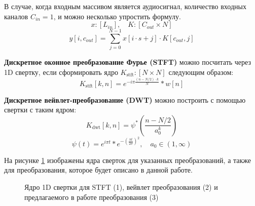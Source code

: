 В случае, когда входным массивом является аудиосигнал, количество входных каналов $C_{in} = 1$, и можно несколько упростить формулу. 
\[x: [L_{in}], \quad K: [C_{out} \times N]\]
\begin{equation}
	y[i, c_{out}] = \sum_{j=0}^{N-1} x[i \cdot s + j] \cdot K[c_{out}, j]
\end{equation}


\textbf{Дискретное оконное преобразование Фурье (STFT)} можно посчитать через 1D свертку, если сформировать ядро $K_{\mathrm{stft}}: [N \times N]$ следующим образом:
\begin{equation}
	K_{\mathrm{stft}}[k, n] = e^{-i\pi \frac{(n - N/2) \cdot k}{N}} * w[n]
\end{equation}

\textbf{Дискретное вейвлет-преобразование (DWT)} можно построить с помощью свертки с таким ядром:
\begin{equation}
	K_{\mathrm{dwt}}[k, n] = \psi^* \left(\frac{n - N/2}{a_0^k}\right)
\end{equation}
\[\psi(t) = e^{i\pi t} * e^{-\left(\frac{\pi t}{2\sigma}\right)^2}, \quad   a_0 \in (1, \infty)\]

На рисунке \ref{fig:stft_kernel} изображены ядра сверток для указанных преобразований, а также для преобразования, которое будет описано в данной работе.

\begin{figure}
  \centering
  \caption{Ядро 1D свертки для STFT (1), вейвлет преобразования (2) и предлагаемого в работе преобразования (3)}
  \label{fig:stft_kernel}
\end{figure}





